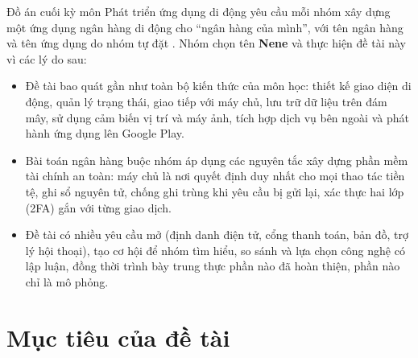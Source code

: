 Đồ án cuối kỳ môn Phát triển ứng dụng di động yêu cầu mỗi nhóm xây dựng một ứng dụng ngân hàng di động cho ``ngân hàng của mình'', với tên ngân hàng và tên ứng dụng do nhóm tự đặt \parencite{ch1-debai}. Nhóm chọn tên \textbf{Nene} và thực hiện đề tài này vì các lý do sau:
\begin{itemize}
	\item Đề tài bao quát gần như toàn bộ kiến thức của môn học: thiết kế giao diện di động, quản lý trạng thái, giao tiếp với máy chủ, lưu trữ dữ liệu trên đám mây, sử dụng cảm biến vị trí và máy ảnh, tích hợp dịch vụ bên ngoài và phát hành ứng dụng lên Google Play.
	\item Bài toán ngân hàng buộc nhóm áp dụng các nguyên tắc xây dựng phần mềm tài chính an toàn: máy chủ là nơi quyết định duy nhất cho mọi thao tác tiền tệ, ghi sổ nguyên tử, chống ghi trùng khi yêu cầu bị gửi lại, xác thực hai lớp (2FA) gắn với từng giao dịch.
	\item Đề tài có nhiều yêu cầu mở (định danh điện tử, cổng thanh toán, bản đồ, trợ lý hội thoại), tạo cơ hội để nhóm tìm hiểu, so sánh và lựa chọn công nghệ có lập luận, đồng thời trình bày trung thực phần nào đã hoàn thiện, phần nào chỉ là mô phỏng.
\end{itemize}

\section{Mục tiêu của đề tài}
\label{sec:ch1-muc-tieu}

